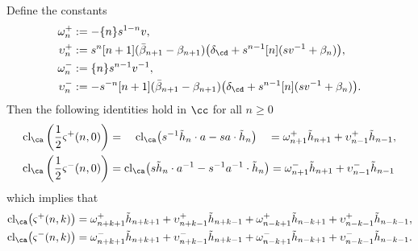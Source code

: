 \begin{lemma} \label{lemma:skewclosures}
Define the constants
\begin{align*}
\omega_{n}^+ &:= - \{n\} s^{1-n} v, \\
\upsilon_{n}^+ &:= s^{n} [n+1] (\bar{\beta}_{n+1} - \beta_{n+1} ) \big( \delta_\cd + s^{n-1} [n] ( s v^{-1} + \beta_{n} ) \big), \\
\omega_{n}^- &:= \{n\} s^{n-1} v^{-1}, \\
\upsilon_{n}^- &:= -s^{-n} [n+1] ( \bar{\beta}_{n+1} - \beta_{n+1} ) \big( \delta_\cd + s^{n-1} [n] ( s v^{-1} + \beta_{n} ) \big).
\end{align*}
Then the following identities hold in $\cc$ for all $n \geq 0$ 
\begin{align*}
\textrm{cl}_\ca \left( \frac{1}{2} \varsigma^+(n,0) \right) &= \quad \textrm{cl}_\ca \big( s^{-1} \tilde{h}_n \cdot a - s a \cdot \tilde{h}_n \big) \quad = \omega_{n+1}^+ \tilde{h}_{n+1} + \upsilon_{n-1}^+ \tilde{h}_{n-1}, \\
\textrm{cl}_\ca \left( \frac{1}{2} \varsigma^-(n,0) \right) &=\textrm{cl}_\ca \big( s \tilde{h}_n \cdot a^{-1} - s^{-1} a^{-1} \cdot \tilde{h}_n \big) = \omega_{n+1}^- \tilde{h}_{n+1} + \upsilon_{n-1}^- \tilde{h}_{n-1}
\end{align*}
which implies that
\begin{align*}
\textrm{cl}_\ca \big( \varsigma^+ (n, k) \big) &= \omega_{n+k+1}^+ \tilde{h}_{n+k+1} + \upsilon_{n+k-1}^+ \tilde{h}_{n+k-1} + \omega_{n-k+1}^+ \tilde{h}_{n-k+1} + \upsilon_{n-k-1}^+ \tilde{h}_{n-k-1}, \\
\textrm{cl}_\ca \big( \varsigma^- (n, k) \big) &= \omega_{n+k+1}^- \tilde{h}_{n+k+1} + \upsilon_{n+k-1}^- \tilde{h}_{n+k-1} + \omega_{n-k+1}^- \tilde{h}_{n-k+1} + \upsilon_{n-k-1}^- \tilde{h}_{n-k-1}.
\end{align*}
\end{lemma}
